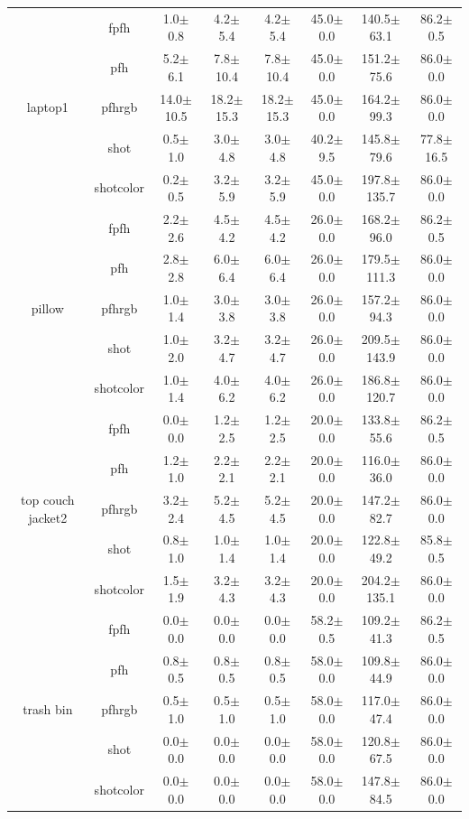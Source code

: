 \documentclass[11pt,a4paper]{kth-mag}
\begin{document}
\begin{table}
{\begin{tabular}{cc|cccccc}
    \multirow{5}{*}{laptop1} & fpfh & 1.0$\pm$0.8 & 4.2$\pm$5.4 & 4.2$\pm$5.4 & 45.0$\pm$0.0 & 140.5$\pm$63.1 & 86.2$\pm$0.5\\
           & pfh & 5.2$\pm$6.1 & 7.8$\pm$10.4 & 7.8$\pm$10.4 & 45.0$\pm$0.0 & 151.2$\pm$75.6 & 86.0$\pm$0.0\\
           & pfhrgb & 14.0$\pm$10.5 & 18.2$\pm$15.3 & 18.2$\pm$15.3 & 45.0$\pm$0.0 & 164.2$\pm$99.3 & 86.0$\pm$0.0\\
           & shot & 0.5$\pm$1.0 & 3.0$\pm$4.8 & 3.0$\pm$4.8 & 40.2$\pm$9.5 & 145.8$\pm$79.6 & 77.8$\pm$16.5\\
           & shotcolor & 0.2$\pm$0.5 & 3.2$\pm$5.9 & 3.2$\pm$5.9 & 45.0$\pm$0.0 & 197.8$\pm$135.7 & 86.0$\pm$0.0\\\hline
    \multirow{5}{*}{pillow} & fpfh & 2.2$\pm$2.6 & 4.5$\pm$4.2 & 4.5$\pm$4.2 & 26.0$\pm$0.0 & 168.2$\pm$96.0 & 86.2$\pm$0.5\\
           & pfh & 2.8$\pm$2.8 & 6.0$\pm$6.4 & 6.0$\pm$6.4 & 26.0$\pm$0.0 & 179.5$\pm$111.3 & 86.0$\pm$0.0\\
           & pfhrgb & 1.0$\pm$1.4 & 3.0$\pm$3.8 & 3.0$\pm$3.8 & 26.0$\pm$0.0 & 157.2$\pm$94.3 & 86.0$\pm$0.0\\
           & shot & 1.0$\pm$2.0 & 3.2$\pm$4.7 & 3.2$\pm$4.7 & 26.0$\pm$0.0 & 209.5$\pm$143.9 & 86.0$\pm$0.0\\
           & shotcolor & 1.0$\pm$1.4 & 4.0$\pm$6.2 & 4.0$\pm$6.2 & 26.0$\pm$0.0 & 186.8$\pm$120.7 & 86.0$\pm$0.0\\\hline
    \multirow{5}{*}{top couch jacket2} & fpfh & 0.0$\pm$0.0 & 1.2$\pm$2.5 & 1.2$\pm$2.5 & 20.0$\pm$0.0 & 133.8$\pm$55.6 & 86.2$\pm$0.5\\
           & pfh & 1.2$\pm$1.0 & 2.2$\pm$2.1 & 2.2$\pm$2.1 & 20.0$\pm$0.0 & 116.0$\pm$36.0 & 86.0$\pm$0.0\\
           & pfhrgb & 3.2$\pm$2.4 & 5.2$\pm$4.5 & 5.2$\pm$4.5 & 20.0$\pm$0.0 & 147.2$\pm$82.7 & 86.0$\pm$0.0\\
           & shot & 0.8$\pm$1.0 & 1.0$\pm$1.4 & 1.0$\pm$1.4 & 20.0$\pm$0.0 & 122.8$\pm$49.2 & 85.8$\pm$0.5\\
           & shotcolor & 1.5$\pm$1.9 & 3.2$\pm$4.3 & 3.2$\pm$4.3 & 20.0$\pm$0.0 & 204.2$\pm$135.1 & 86.0$\pm$0.0\\\hline
    \multirow{5}{*}{trash bin} & fpfh & 0.0$\pm$0.0 & 0.0$\pm$0.0 & 0.0$\pm$0.0 & 58.2$\pm$0.5 & 109.2$\pm$41.3 & 86.2$\pm$0.5\\
           & pfh & 0.8$\pm$0.5 & 0.8$\pm$0.5 & 0.8$\pm$0.5 & 58.0$\pm$0.0 & 109.8$\pm$44.9 & 86.0$\pm$0.0\\
           & pfhrgb & 0.5$\pm$1.0 & 0.5$\pm$1.0 & 0.5$\pm$1.0 & 58.0$\pm$0.0 & 117.0$\pm$47.4 & 86.0$\pm$0.0\\
           & shot & 0.0$\pm$0.0 & 0.0$\pm$0.0 & 0.0$\pm$0.0 & 58.0$\pm$0.0 & 120.8$\pm$67.5 & 86.0$\pm$0.0\\
           & shotcolor & 0.0$\pm$0.0 & 0.0$\pm$0.0 & 0.0$\pm$0.0 & 58.0$\pm$0.0 & 147.8$\pm$84.5 & 86.0$\pm$0.0\\\hline
  \end{tabular}
  }
\end{table}
\end{document}
